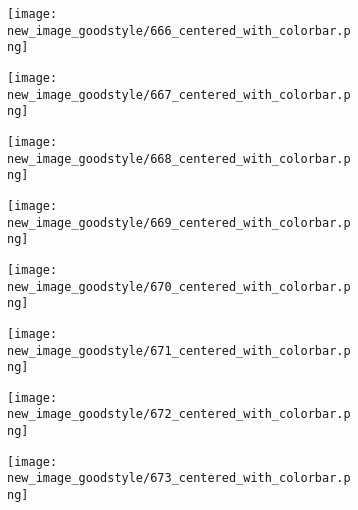 \documentclass[a4paper,12pt]{article}
\begin{document}
\begin{figure}[H]
  \begin{subfigure}{0.11\textwidth}
    \texttt{[image: new\_image\_goodstyle/666\_centered\_with\_colorbar.png]}
  \end{subfigure}
  \hfill
  \begin{subfigure}{0.11\textwidth}
    \texttt{[image: new\_image\_goodstyle/667\_centered\_with\_colorbar.png]}
  \end{subfigure}
  \hfill
  \begin{subfigure}{0.11\textwidth}
    \texttt{[image: new\_image\_goodstyle/668\_centered\_with\_colorbar.png]}
  \end{subfigure}
  \hfill
  \begin{subfigure}{0.11\textwidth}
    \texttt{[image: new\_image\_goodstyle/669\_centered\_with\_colorbar.png]}
  \end{subfigure}
  \hfill
  \begin{subfigure}{0.11\textwidth}
    \texttt{[image: new\_image\_goodstyle/670\_centered\_with\_colorbar.png]}
  \end{subfigure}
  \hfill
  \begin{subfigure}{0.11\textwidth}
    \texttt{[image: new\_image\_goodstyle/671\_centered\_with\_colorbar.png]}
  \end{subfigure}
  \hfill
  \begin{subfigure}{0.11\textwidth}
    \texttt{[image: new\_image\_goodstyle/672\_centered\_with\_colorbar.png]}
  \end{subfigure}
  \hfill
  \begin{subfigure}{0.11\textwidth}
    \texttt{[image: new\_image\_goodstyle/673\_centered\_with\_colorbar.png]}
  \end{subfigure}
  \hfill
\end{figure}
\end{document}

